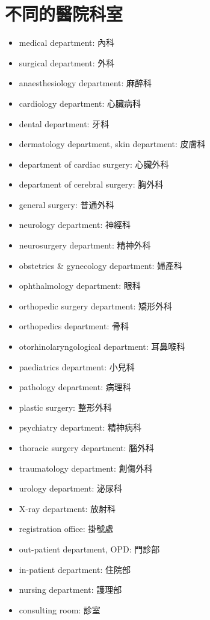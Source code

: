 \section{不同的醫院科室}
\begin{multicols}{2}
\begin{itemize}
  \itemsep0em
  \item medical department: 內科
  \item surgical department: 外科
  \item anaesthesiology department: 麻醉科
  \item cardiology department: 心臟病科
  \item dental department: 牙科
  \item dermatology department, skin department: 皮膚科
  \item department of cardiac surgery: 心臟外科
  \item department of cerebral surgery: 胸外科
  \item general surgery: 普通外科
  \item neurology department: 神經科
  \item neurosurgery department: 精神外科
  \item obstetrics \& gynecology department: 婦產科
  \item ophthalmology department: 眼科
  \item orthopedic surgery department: 矯形外科
  \item orthopedics department: 骨科
  \item otorhinolaryngological department: 耳鼻喉科
  \item paediatrics department: 小兒科
  \item pathology department: 病理科
  \item plastic surgery: 整形外科
  \item psychiatry department: 精神病科
  \item thoracic surgery department: 腦外科
  \item traumatology department: 創傷外科
  \item urology department: 泌尿科
  \item X-ray department: 放射科
  \item registration office: 掛號處
  \item out-patient department, OPD: 門診部
  \item in-patient department: 住院部
  \item nursing department: 護理部
  \item consulting room: 診室

\end{itemize}
\end{multicols}
